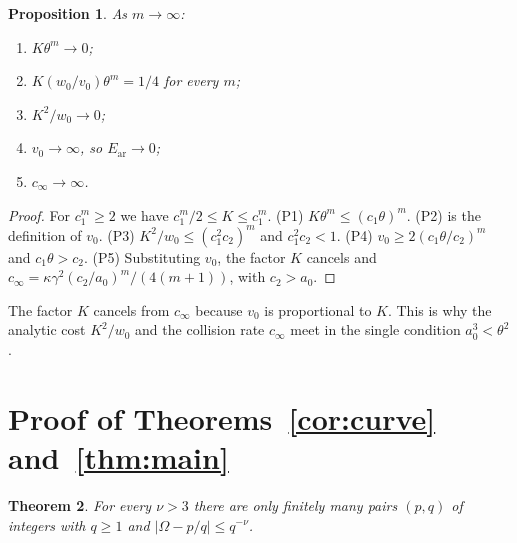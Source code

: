 \documentclass[11pt]{amsart}
\newtheorem{theorem}{Theorem}[section]
\newtheorem{proposition}[theorem]{Proposition}
\theoremstyle{definition}
\theoremstyle{remark}
\numberwithin{equation}{section}
\newcommand{\Ear}{E_{\mathrm{ar}}}
\begin{document}
\begin{proposition}\label{prop:params}
As $m\to\infty$:
\begin{enumerate}[label=(P\arabic*)]
\item $K\theta^m\to0$;
\item $K(w_0/v_0)\theta^m=1/4$ for every $m$;
\item $K^2/w_0\to0$;
\item $v_0\to\infty$, so $\Ear\to0$;
\item $c_\infty\to\infty$.
\end{enumerate}
\end{proposition}

\begin{proof}
For $c_1^m\ge2$ we have $c_1^m/2\le K\le c_1^m$. (P1) $K\theta^m\le(c_1\theta)^m$. (P2) is the definition of
$v_0$. (P3) $K^2/w_0\le(c_1^2c_2)^m$ and $c_1^2c_2<1$. (P4) $v_0\ge2(c_1\theta/c_2)^m$ and $c_1\theta>c_2$.
(P5) Substituting $v_0$, the factor $K$ cancels and
$c_\infty=\kappa\gamma^2(c_2/a_0)^m/(4(m+1))$, with $c_2>a_0$.
\end{proof}

The factor $K$ cancels from $c_\infty$ because $v_0$ is proportional to $K$. This is why the analytic cost
$K^2/w_0$ and the collision rate $c_\infty$ meet in the single condition $a_0^3<\theta^2$.

\section{Proof of Theorems~\ref{cor:curve} and~\ref{thm:main}}\label{sec:proof}

\begin{theorem}\label{thm:omega}
For every $\nu>3$ there are only finitely many pairs $(p,q)$ of integers with $q\ge1$ and
$|\Omega-p/q|\le q^{-\nu}$.
\end{theorem}
\end{document}
